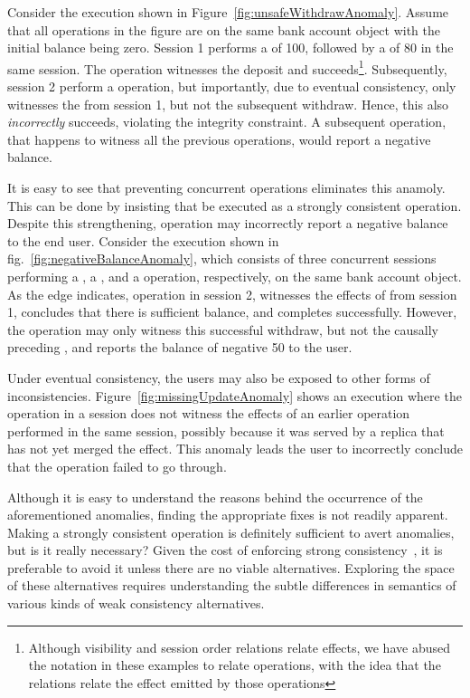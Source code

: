 Consider the execution shown in Figure~\ref{fig:unsafeWithdrawAnomaly}. Assume
that all operations in the figure are on the same bank account object with the
initial balance being zero. Session 1 performs a  of 100, followed
by a  of 80 in the same session. The  operation
witnesses the deposit and succeeds\footnote{Although visibility and session
order relations relate effects, we have abused the notation in these examples
to relate operations, with the idea that the relations relate the effect
emitted by those operations}. Subsequently, session 2 perform a 
operation, but importantly, due to eventual consistency, only witnesses the
 from session 1, but not the subsequent withdraw. Hence, this
 also \emph{incorrectly} succeeds, violating the integrity
constraint. A subsequent  operation, that happens to witness all
the previous operations, would report a negative balance.

It is easy to see that preventing concurrent  operations
eliminates this anamoly. This can be done by insisting that  be
executed as a strongly consistent operation. Despite this strengthening,
 operation may incorrectly report a negative balance to the end
user. Consider the execution shown in fig.~\ref{fig:negativeBalanceAnomaly},
which consists of three concurrent sessions performing a , a
, and a  operation, respectively, on the same bank
account object. As the  edge indicates, operation  in
session 2, witnesses the effects of  from session 1, concludes
that there is sufficient balance, and completes successfully. However, the
 operation may only witness this successful withdraw, but not
the causally preceding , and reports the balance of negative 50 to
the user.

Under eventual consistency, the users may also be exposed to other forms of
inconsistencies. Figure~\ref{fig:missingUpdateAnomaly} shows an execution where
the  operation in a session does not witness the effects of an
earlier  operation performed in the same session, possibly because
it was served by a replica that has not yet merged the  effect.
This anomaly leads the user to incorrectly conclude that the 
operation failed to go through.

Although it is easy to understand the reasons behind the occurrence of the
aforementioned anomalies, finding the appropriate fixes is not readily
apparent. Making  a strongly consistent operation is definitely
sufficient to avert anomalies, but is it really necessary? Given the cost of
enforcing strong consistency~\cite{DynamoDB,Terry2013}, it is preferable to avoid
it unless there are no viable alternatives. Exploring the space of these
alternatives requires understanding the subtle differences in semantics of
various kinds of weak consistency alternatives.

